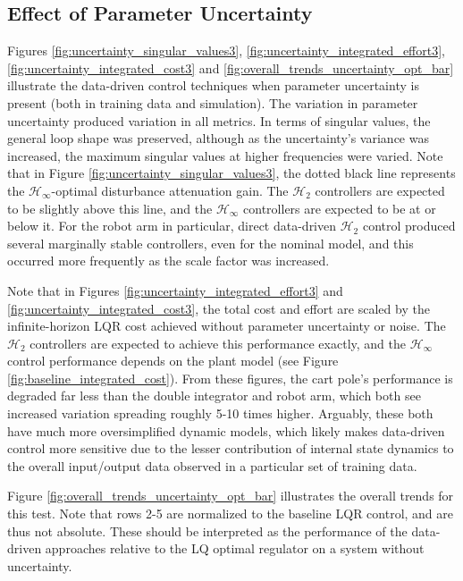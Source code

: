 \subsection{Effect of Parameter Uncertainty}
Figures \ref{fig:uncertainty_singular_values3}, \ref{fig:uncertainty_integrated_effort3}, \ref{fig:uncertainty_integrated_cost3} and \ref{fig:overall_trends_uncertainty_opt_bar} illustrate the data-driven control techniques when parameter uncertainty is present (both in training data and simulation).  The variation in parameter uncertainty produced variation in all metrics.  In terms of singular values, the general loop shape was preserved, although as the uncertainty's variance was increased, the maximum singular values at higher frequencies were varied.  Note that in Figure \ref{fig:uncertainty_singular_values3}, the dotted black line represents the $\mathcal{H}_{\infty}$-optimal disturbance attenuation gain.  The $\mathcal{H}_{2}$ controllers are expected to be slightly above this line, and the $\mathcal{H}_{\infty}$ controllers are expected to be at or below it.  For the robot arm in particular, direct data-driven $\mathcal{H}_{2}$ control produced several marginally stable controllers, even for the nominal model, and this occurred more frequently as the scale factor was increased.

Note that in Figures \ref{fig:uncertainty_integrated_effort3} and \ref{fig:uncertainty_integrated_cost3}, the total cost and effort are scaled by the infinite-horizon LQR cost achieved without parameter uncertainty or noise.  The $\mathcal{H}_{2}$ controllers are expected to achieve this performance exactly, and the $\mathcal{H}_{\infty}$ control performance depends on the plant model (see Figure \ref{fig:baseline_integrated_cost}).  From these figures, the cart pole's performance is degraded far less than the double integrator and robot arm, which both see increased variation spreading roughly 5-10 times higher.  Arguably, these both have much more oversimplified dynamic models, which likely makes data-driven control more sensitive due to the lesser contribution of internal state dynamics to the overall input/output data observed in a particular set of training data.

Figure \ref{fig:overall_trends_uncertainty_opt_bar} illustrates the overall trends for this test.  Note that rows 2-5 are normalized to the baseline LQR control, and are thus not absolute.  These should be interpreted as the performance of the data-driven approaches relative to the LQ optimal regulator on a system without uncertainty.

